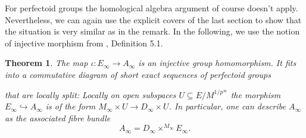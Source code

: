 \documentclass[10pt,oneside]{amsart}
\newtheorem{theorem}{Theorem}[section]
\theoremstyle{definition}
\begin{document}
	For perfectoid groups the homological algebra argument of course doesn't apply. Nevertheless, we can again use the explicit covers of the last section to show that the situation is very similar as in the remark. In the following, we use the notion of injective morphism from \cite{etale_cohomology_of_diamonds}, Definition 5.1.
	\begin{theorem}\label{the morphism E->A in the limit}
		The map $\iota:E_\infty \rightarrow A_\infty$ is an injective group homomorphism. It fits into a commutative diagram of short exact sequences of perfectoid groups
		\begin{center}
		\end{center}
		that are locally split: Locally on open subspaces $U\subseteq E/M^{1/p^\infty}$ the morphism $E_\infty\hookrightarrow A_\infty$ is of the form $M_\infty\times U\rightarrow D_\infty \times U$.	In particular, one can describe $A_\infty$ as the associated fibre bundle
		\[A_\infty = D_\infty\times^{M_\infty}E_\infty.\]
	\end{theorem}
\end{document}
